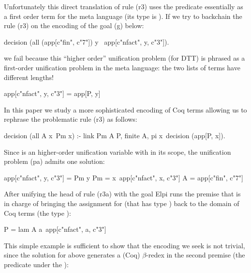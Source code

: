 \documentclass[sigconf,natbib=false]{acmart}
\begin{document}
\noindent
Unfortunately this direct translation of rule (r3) uses the
predicate  essentially as a first order term for the meta
language (its type is ).
If we try to backchain the rule (r3) on the encoding of the goal (g) below:
  
\begin{elpicode}
decision (all (app[c"fin", c"7"]) y\                 %
  app[c"nfact", y, c"3"]).
\end{elpicode}

\noindent
we fail because this ``higher order'' unification problem (for DTT)
is phrased as a first-order unification problem in the meta language:
the two lists of terms have different lengths!

\begin{elpicode}
app[c"nfact", y, c"3"] = app[P, y]                   %
\end{elpicode}

\noindent
In this paper we study a more sophisticated encoding of Coq terms allowing
us to rephrase the problematic rule (r3) as follows:

\begin{elpicode}
decision (all A x\ Pm x) :- link Pm A P, finite A,   %
  pi x\ decision (app[P, x]).
\end{elpicode}

\noindent
Since  is an higher-order unification variable with 
in its scope, the unification problem (pa) admits one solution:

\begin{elpicode}
app[c"nfact", y, c"3"] = Pm y                       %
Pm = x\ app[c"nfact", x, c"3"]       %
A = app[c"fin", c"7"]                %
\end{elpicode}
  
\noindent
After unifying the head of rule (r3a) with the goal Elpi runs
the premise  that is in charge of bringing the
assignment for  (that has type )
back to the domain of Coq terms (the type ):

\begin{elpicode}
P = lam A a\ app[c"nfact", a, c"3"]
\end{elpicode}

\noindent
This simple example is sufficient to show that the encoding we seek
is not trivial, since the solution for  above generates a
(Coq) $\beta$-redex in the second premise (the predicate
under the \hspace{-0.8em}):
\end{document}
